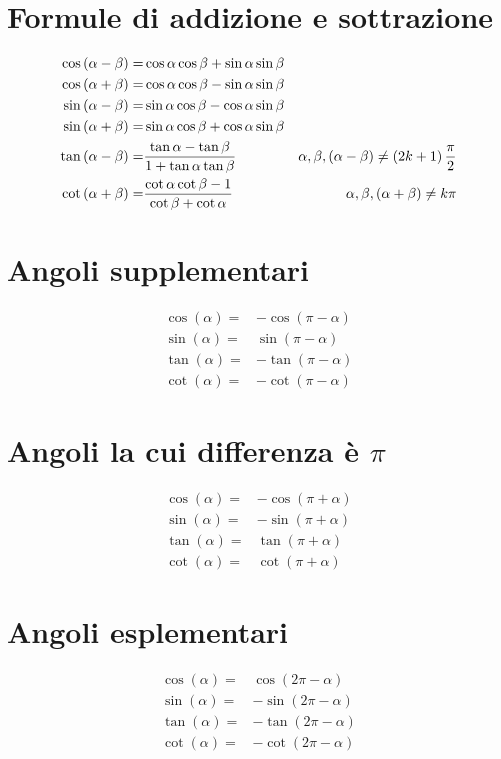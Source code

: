 \section{Formule di addizione e sottrazione}
\begin{align*}
\cos\left(\alpha-\beta\right)=&{}\cos\alpha\cos\beta+\sin\alpha\sin\beta\\\index{Coseno!differenza angoli}
\cos\left(\alpha+\beta\right)=&{}\cos\alpha\cos\beta-\sin\alpha\sin\beta\\\index{Coseno!somma angoli}
\sin\left(\alpha-\beta\right)=&{}\sin\alpha\cos\beta-\cos\alpha\sin\beta\\\index{Seno!differenza angoli}
\sin\left(\alpha+\beta\right)=&{}\sin\alpha\cos\beta+\cos\alpha\sin\beta\\\index{Seno!somma angoli}
\tan\left(\alpha-\beta\right)=&{}\dfrac{\tan\alpha-\tan\beta}{1+\tan\alpha\tan\beta} &\alpha,\beta,\left(\alpha-\beta\right)\neq\left(2k+1\right)\dfrac{\pi}{2}\\\index{Tangente!differenza angoli}
\cot\left(\alpha+\beta\right)=&{}\dfrac{\cot\alpha\cot\beta-1}{\cot\beta+\cot\alpha}
&\alpha,\beta,\left(\alpha+\beta\right)\neq k\pi\index{Cotangente!somma angoli}
\end{align*}
\section{Angoli supplementari}
\begin{align*}
\cos(\alpha)=&-\cos(\pi-\alpha)\\
\sin(\alpha)=&\sin(\pi-\alpha)\\
\tan(\alpha)=&-\tan(\pi-\alpha)\\
\cot(\alpha)=&-\cot(\pi-\alpha)
\end{align*}
\section{Angoli la cui differenza è \texorpdfstring{$\pi$}{\textpi}}
\begin{align*}
\cos(\alpha)=&-\cos(\pi+\alpha)\\
\sin(\alpha)=&-\sin(\pi+\alpha)\\
\tan(\alpha)=&\tan(\pi+\alpha)\\
\cot(\alpha)=&\cot(\pi+\alpha)
\end{align*}
\section{Angoli esplementari}
\begin{align*}
\cos(\alpha)=&\cos(2\pi-\alpha)\\
\sin(\alpha)=&-\sin(2\pi-\alpha)\\
\tan(\alpha)=&-\tan(2\pi-\alpha)\\
\cot(\alpha)=&-\cot(2\pi-\alpha)
\end{align*}
